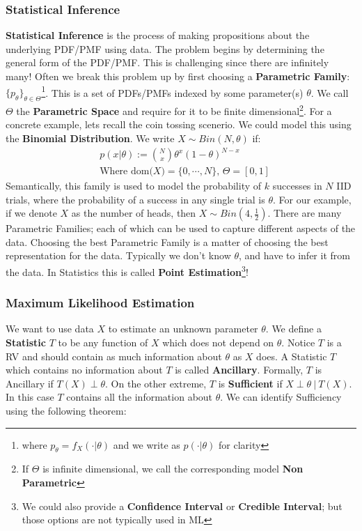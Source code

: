 \documentclass[]{article}
\theoremstyle{mattstyle}
\theoremstyle{definition}
\begin{document}
\subsubsection{Statistical Inference}

\textbf{Statistical Inference}  is the process of making propositions about the underlying PDF/PMF using data. The problem begins by determining the general form of the PDF/PMF. This is challenging since there are infinitely many! 
Often we break this problem up by first choosing a \textbf{Parametric Family}: $\{p_{\theta}\}_{\theta\in\Theta}$\footnote{where $p_{\theta} = f_X(\cdot|\theta)$ and we write as $p(\cdot|\theta)$ for clarity}. This is a set of PDFs/PMFs indexed by some parameter(s) $\theta$. We call $\Theta$ the \textbf{Parametric Space} and require for it to be finite dimensional\footnote{If $\Theta$ is infinite dimensional, we call the corresponding model \textbf{Non Parametric}}. For a concrete example, lets recall the coin tossing scenerio. We could model this using the \textbf{Binomial Distribution}. We write $X\sim Bin(N, \theta)$ if:
\begin{align*}
&p(x|\theta) := {N \choose x}\theta^x(1-\theta)^{N-x}\\
&\text{Where dom($X$)$=\{0, \cdots, N\}$, $\Theta=[0,1]$}
\end{align*}
Semantically, this family is used to model the probability of $k$ successes in $N$ IID trials, where the probability of a success in any single trial is $\theta$. For our example, if we denote $X$ as the number of heads, then $X \sim Bin(4, \frac{1}{2})$. There are many Parametric Families; each of which can be used to capture different aspects of the data. Choosing the best Parametric Family is a matter of choosing the best representation for the data. Typically we don't know $\theta$, and have to infer it from the data. In Statistics this is called \textbf{Point Estimation}\footnote{We could also provide a \textbf{Confidence Interval} or \textbf{Credible Interval}; but those options are not typically used in ML}!

\newpage

\subsubsection{Maximum Likelihood Estimation}\label{sec:parest}

We want to use data $X$ to estimate an unknown parameter $\theta$. We define a \textbf{Statistic} $T$ to be any function of $X$ which does not depend on $\theta$. Notice $T$ is a RV and should contain as much information about $\theta$ as $X$ does. A Statistic $T$ which contains no information about $T$ is called \textbf{Ancillary}. Formally, $T$ is Ancillary if $T(X) \perp \theta$. On the other extreme, $T$ is \textbf{Sufficient} if $X \perp \theta \ | \ T(X)$. In this case $T$ contains all the information about $\theta$. We can identify Sufficiency using the following theorem:
\end{document}
